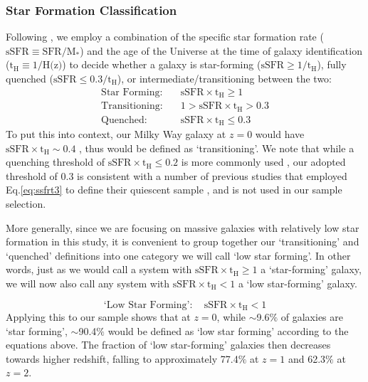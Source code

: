 \documentclass[twocolumn, linenumbers]{aastex631}
\newcommand{\sfr}{\text{SFR}}
\newcommand{\ssfr}{\text{sSFR}}
\newcommand{\tH}{\text{t}_\text{H}}
\newcommand{\eq}{Eq.\hspace{.2em}}
\begin{document}
\subsubsection{Star Formation Classification}
\label{ssec:select}
Following \cite{mergers}, we employ a combination of the specific star formation rate ($\ssfr\equiv \sfr/\text{M}_{*}$) and the age of the Universe at the time of galaxy identification ($\tH\equiv 1/\text{H(z)}$) to decide whether a galaxy is star-forming ($\ssfr\geq 1/\tH$), fully quenched ($\ssfr\leq 0.3/\tH$), or intermediate/transitioning between the two:
\begin{align}
    \textrm{Star Forming}:\quad &\ssfr\times \tH \geq 1\label{eq:ssfrt1}\\
    \textrm{Transitioning}:\quad &1>\ssfr\times \tH>0.3\label{eq:ssfrt2}\\
    \textrm{Quenched}:\quad &\ssfr \times \tH \leq 0.3\label{eq:ssfrt3}
\end{align}
To put this into context, our Milky Way galaxy at $z=0$ would have $\ssfr\times\tH\sim0.4$ \citep{Licquia15}, thus would be defined as `transitioning'.  We note that while a quenching threshold of $\ssfr\times \tH\leq 0.2$ is more commonly used \citep{Tacchella15, Pacifici16, whitakerReview}, our adopted threshold of 0.3 is consistent with a number of previous studies that employed \eq \ref{eq:ssfrt3} to define their quiescent sample \citep[e.g.][]{Franx08,Williams10, Szomoru13, Lotz19}, and is not used in our sample selection.


More generally, since we are focusing on massive galaxies with relatively low star formation in this study, it is convenient to group together our `transitioning' and `quenched' definitions into one category we will call `low star forming'.  In other words, just as we would call a system with $\ssfr\times \tH\geq 1$ a `star-forming' galaxy, we will now also call any system with $\ssfr\times \tH<1$ a `low star-forming' galaxy.

\begin{equation}
     \textrm{`Low Star Forming'}:\quad \ssfr\times \tH < 1
     \label{eq:ssfrt4}
\end{equation}
Applying this to our sample shows that at $z=0$, while $\sim$9.6$\%$ of galaxies are `star forming', $\sim$90.4$\%$ would be defined as `low star forming' according to the equations above.  The fraction of `low star-forming' galaxies then decreases towards higher redshift, falling to approximately 77.4$\%$ at $z=1$ and 62.3$\%$ at $z=2$.
\end{document}
